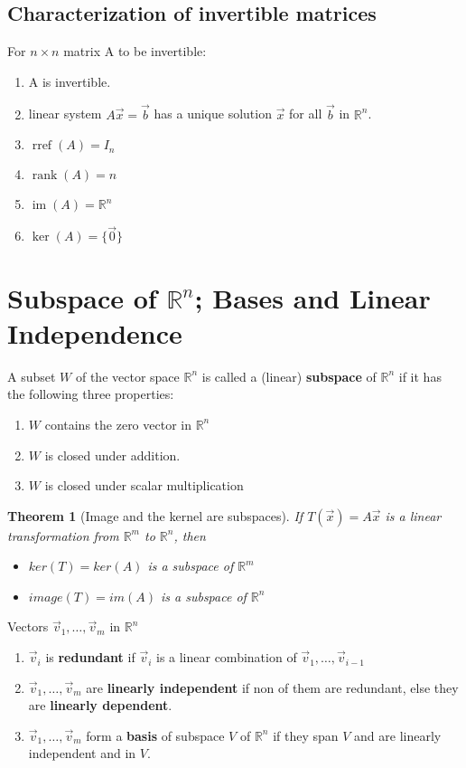 \documentclass[letter]{article}
\newcommand{\R}{\mathbb{R}}
\newcommand{\im}{\operatorname{im}}
\newcommand{\rref}{\operatorname{rref}}
\newcommand{\rank}{\operatorname{rank}}
\newtheorem{theorem}{Theorem}[section]
\newenvironment{definition}[1][Definition]{\begin{trivlist}
\item[\hskip \labelsep {\bfseries #1}]}{\end{trivlist}}
\begin{document}
\subsection{Characterization of invertible matrices}
For $n\times n$ matrix A to be invertible:
\begin{enumerate}
\item A is invertible.
\item linear system $A\vec x = \vec b$ has a unique solution $\vec x$ for all $\vec b$ in $\R^n$.
\item $\rref(A) = I_n$
\item $\rank(A) = n$
\item $\im(A) = \R^n$
\item $\ker(A) = \{\vec 0\}$
\end{enumerate}


\section{Subspace of $\R^n$; Bases and Linear Independence}
\begin{definition}
A subset $W$ of the vector space $\R^n$ is called a (linear) \textbf{subspace} of $\R^n$ if it has the following three properties:
\begin{enumerate}
\item $W$ contains the zero vector in $\R^n$
\item $W$ is closed under addition.
\item $W$ is closed under scalar multiplication
\end{enumerate}
\end{definition}

\begin{theorem}[Image and the kernel are subspaces]
If $T(\vec x) = A \vec x$ is a linear transformation from $\R^m$ to $\R^n$, then
\begin{itemize}
\item $ker(T) = ker(A)$ is a subspace of $\R^m$
\item $image(T) = im(A)$ is a subspace of $\R^n$
\end{itemize}
\end{theorem}

\begin{definition}
Vectors $\vec v_1, \ldots, \vec v_m$ in $\R^n$
\begin{enumerate}
\item $\vec v_i$ is \textbf{redundant} if $\vec v_i$ is a linear combination of  $\vec v_1, \ldots, \vec v_{i-1}$
\item $\vec v_1, \ldots, \vec v_m$ are \textbf{linearly independent} if non of them are redundant, else they are \textbf{linearly dependent}.
\item  $\vec v_1, \ldots, \vec v_m$ form a \textbf{basis} of subspace $V$ of $\R^n$ if they span $V$ and are linearly independent and in $V$.
\end{enumerate}
\end{definition}
\end{document}
